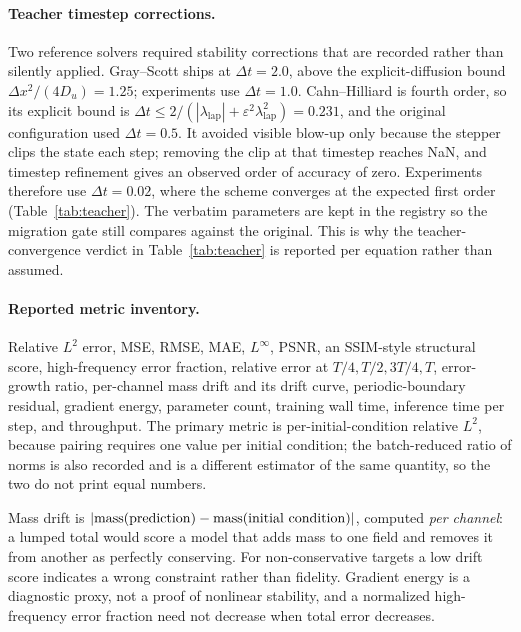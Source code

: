 

\paragraph{Teacher timestep corrections.}
Two reference solvers required stability corrections that are recorded rather than
silently applied. Gray--Scott ships at $\Delta t=2.0$, above the explicit-diffusion bound
$\Delta x^2/(4D_u)=1.25$; experiments use $\Delta t=1.0$. Cahn--Hilliard is fourth order,
so its explicit bound is $\Delta t\le 2/(|\lambda_{\mathrm{lap}}|+\varepsilon^2
\lambda_{\mathrm{lap}}^2)=0.231$, and the original configuration used $\Delta t=0.5$. It
avoided visible blow-up only because the stepper clips the state each step; removing the
clip at that timestep reaches NaN, and timestep refinement gives an observed order of
accuracy of zero. Experiments therefore use $\Delta t=0.02$, where the scheme converges
at the expected first order (Table~\ref{tab:teacher}). The verbatim parameters are kept
in the registry so the migration gate still compares against the original. This is why
the teacher-convergence verdict in Table~\ref{tab:teacher} is reported per equation
rather than assumed.

\paragraph{Reported metric inventory.}
Relative $L^2$ error, MSE, RMSE, MAE, $L^\infty$, PSNR, an SSIM-style structural score,
high-frequency error fraction, relative error at $T/4,T/2,3T/4,T$, error-growth ratio,
per-channel mass drift and its drift curve, periodic-boundary residual, gradient energy,
parameter count, training wall time, inference time per step, and throughput. The primary
metric is per-initial-condition relative $L^2$, because pairing requires one value per
initial condition; the batch-reduced ratio of norms is also recorded and is a different
estimator of the same quantity, so the two do not print equal numbers.

Mass drift is $|\mass(\mathrm{prediction})-\mass(\mathrm{initial\ condition})|$, computed
\emph{per channel}: a lumped total would score a model that adds mass to one field and
removes it from another as perfectly conserving. For non-conservative targets a low drift
score indicates a wrong constraint rather than fidelity. Gradient energy is a diagnostic
proxy, not a proof of nonlinear stability, and a normalized high-frequency error fraction
need not decrease when total error decreases.

